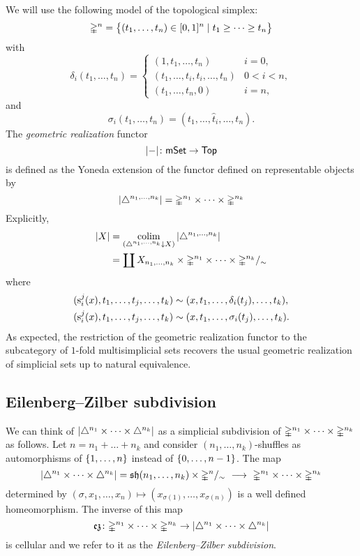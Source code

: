 We will use the following model of the topological simplex:
\[
\mathbb{\Delta}^n = \big\{
(t_1, \dots, t_n) \in [0,1]^n \mid t_1 \geq \dots \geq t_n
\big\}
\]
with
\[
\delta_i(t_1, \dots, t_n) =
\begin{cases}
	(1, t_1, \dots, t_n) & i = 0, \\
	(t_1, \dots, t_i, t_i, \dots, t_n) & 0 < i < n, \\
	(t_1, \dots, t_n, 0) & i = n,
\end{cases}
\]
and
\[
\sigma_i(t_1, \dots, t_n) = (t_1, \dots, \widehat t_i, \dots, t_n).
\]
The \textit{geometric realization} functor
\[
\lvert-\rvert \colon \mathsf{mSet} \to \mathsf{Top}
\]
is defined as the Yoneda extension of the functor defined on representable objects by
\[
\lvert\triangle^{n_1, \dots, n_k}\rvert =
\mathbb{\Delta}^{n_1} \times \dots \times \mathbb{\Delta}^{n_k}
\]
Explicitly,
\begin{align*}
	\bars{X} &=
	\colim_{\cramped{(\simplex^{n_1, \dots, n_k} \downarrow X})} \, \bars{\simplex^{n_1, \dots, n_k}} \\ &=
	\coprod X_{n_1,\dots,n_k} \times \gsimplex^{n_1} \times \dots \times \gsimplex^{n_k} /_\sim
\end{align*}
where
\[
\begin{split}
(\operatorname{s}_i^j(x), t_1, \dots, t_j, \dots, t_k) &\sim (x, t_1, \dots, \delta_i(t_j), \dots, t_k), \\
(\operatorname{s}^j_i(x), t_1, \dots, t_j, \dots, t_k) &\sim (x, t_1, \dots, \sigma_i(t_j), \dots, t_k).
\end{split}
\]
As expected, the restriction of the geometric realization functor to the subcategory of $1$-fold multisimplicial sets recovers the usual geometric realization of simplicial sets up to natural equivalence.

\subsection{Eilenberg--Zilber subdivision}

We can think of $\lvert\triangle^{n_1} \times \dots \times \triangle^{n_k}\rvert$ as a simplicial subdivision of $\mathbb{\Delta}^{n_1} \times \dots \times \mathbb{\Delta}^{n_k}$ as follows.
Let $n = n_1 + \dots + n_k$ and consider $(n_1, \dots, n_k)$-shuffles as automorphisms of $\{1, \dots, n\}$ instead of $\{0, \dots, n-1\}$.
The map
\[
\lvert\triangle^{n_1} \times \dots \times \triangle^{n_k}\rvert =
\operatorname{\mathfrak{sh}}(n_1, \dots, n_k) \times \mathbb{\Delta}^n /_\sim \ \longrightarrow \
\mathbb{\Delta}^{n_1} \times \dots \times \mathbb{\Delta}^{n_k}
\]
determined by $(\sigma, x_1, \dots, x_n) \mapsto (x_{\sigma(1)}, \dots, x_{\sigma(n)})$ is a well defined homeomorphism.
The inverse of this map
\[
\operatorname{\mathfrak{ez}} \colon
\mathbb{\Delta}^{n_1} \times \dots \times \mathbb{\Delta}^{n_k} \to
\lvert\triangle^{n_1} \times \dots \times \triangle^{n_k}\rvert
\]
is cellular and we refer to it as the \textit{Eilenberg--Zilber subdivision}.

